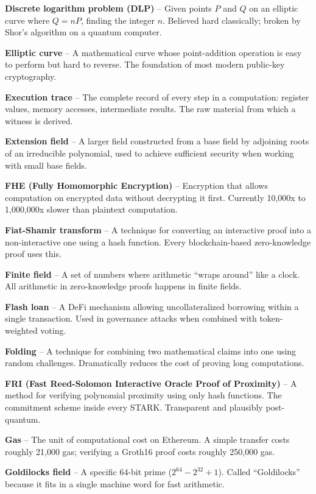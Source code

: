 \documentclass[
  11pt,
  openany]{report}
\renewcommand{\textbf}[1]{{\bfseries\color{MidnightBold}#1}}
\begin{document}
\textbf{Discrete logarithm problem (DLP)} -- Given points \(P\) and \(Q\) on an
elliptic curve where \(Q = nP\), finding the integer \(n\). Believed hard
classically; broken by Shor's algorithm on a quantum computer.

\textbf{Elliptic curve} -- A mathematical curve whose point-addition operation
is easy to perform but hard to reverse. The foundation of most modern public-key
cryptography.

\textbf{Execution trace} -- The complete record of every step in a computation:
register values, memory accesses, intermediate results. The raw material from
which a witness is derived.

\textbf{Extension field} -- A larger field constructed from a base field by
adjoining roots of an irreducible polynomial, used to achieve sufficient
security when working with small base fields.

\textbf{FHE (Fully Homomorphic Encryption)} -- Encryption that allows
computation on encrypted data without decrypting it first. Currently 10,000x to
1,000,000x slower than plaintext computation.

\textbf{Fiat-Shamir transform} -- A technique for converting an interactive
proof into a non-interactive one using a hash function. Every blockchain-based
zero-knowledge proof uses this.

\textbf{Finite field} -- A set of numbers where arithmetic ``wraps around'' like
a clock. All arithmetic in zero-knowledge proofs happens in finite fields.

\textbf{Flash loan} -- A DeFi mechanism allowing uncollateralized borrowing
within a single transaction. Used in governance attacks when combined with
token-weighted voting.

\textbf{Folding} -- A technique for combining two mathematical claims into one
using random challenges. Dramatically reduces the cost of proving long
computations.

\textbf{FRI (Fast Reed-Solomon Interactive Oracle Proof of Proximity)} -- A
method for verifying polynomial proximity using only hash functions. The
commitment scheme inside every STARK. Transparent and plausibly post-quantum.

\textbf{Gas} -- The unit of computational cost on Ethereum. A simple transfer
costs roughly 21,000 gas; verifying a Groth16 proof costs roughly 250,000 gas.

\textbf{Goldilocks field} -- A specific 64-bit prime (\(2^{64} - 2^{32} + 1\)).
Called ``Goldilocks'' because it fits in a single machine word for fast
arithmetic.
\end{document}
